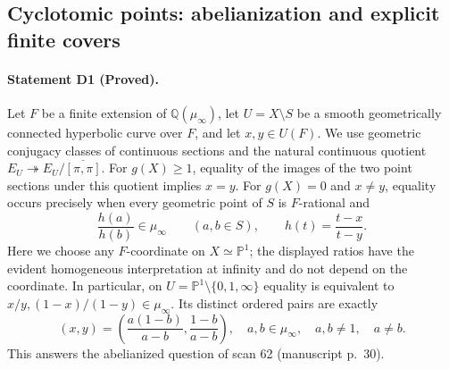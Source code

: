 \subsection{Cyclotomic points: abelianization and explicit finite covers}

\paragraph{Statement D1 (Proved).}\label{res:D1}
Let $F$ be a finite extension of $\mathbb Q(\mu_\infty)$, let
$U=X\setminus S$ be a smooth geometrically connected hyperbolic curve over
$F$, and let $x,y\in U(F)$.  We use geometric conjugacy classes of continuous
sections and the natural continuous quotient
$E_U\twoheadrightarrow E_U/\overline{[\pi,\pi]}$.
For $g(X)\geq1$, equality of the images of the two point sections under this
quotient implies $x=y$.  For $g(X)=0$ and $x\ne y$, equality occurs precisely
when every geometric point of $S$ is $F$-rational and
\[
 \frac{h(a)}{h(b)}\in\mu_\infty\qquad(a,b\in S),\qquad
 h(t)=\frac{t-x}{t-y}.
\]
Here we choose any $F$-coordinate on $X\simeq\mathbb P^1$; the displayed
ratios have the evident homogeneous interpretation at infinity and do not
depend on the coordinate.  In particular, on
$U=\mathbb P^1\setminus\{0,1,\infty\}$ equality is equivalent to
$x/y,(1-x)/(1-y)\in\mu_\infty$.  Its distinct ordered pairs are exactly
\[
 (x,y)=\left(\frac{a(1-b)}{a-b},\frac{1-b}{a-b}\right),\quad
 a,b\in\mu_\infty,\quad a,b\ne1,\quad a\ne b.
\]
This answers the abelianized question of scan 62 (manuscript p.~30).

